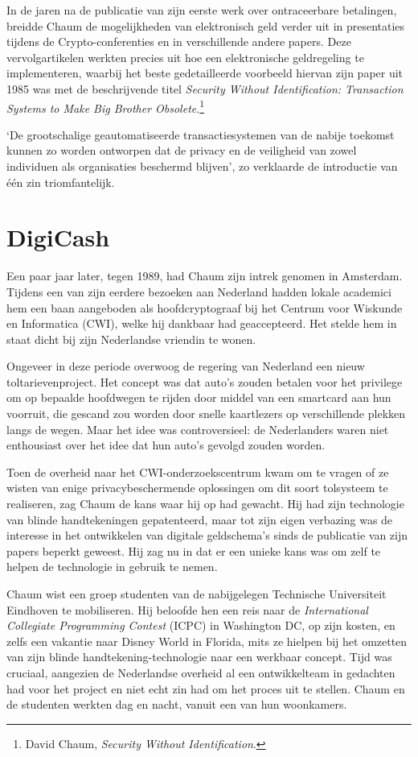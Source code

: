 \documentclass[
  a5paper,
  smalldemyvopaper,11pt,twoside,onecolumn,openright,extrafontsizes,
hidelinks]{memoir}
\begin{document}
In de jaren na de publicatie van zijn eerste werk over ontraceerbare
betalingen, breidde Chaum de mogelijkheden van elektronisch geld verder
uit in presentaties tijdens de Crypto-conferenties en in verschillende
andere papers. Deze vervolgartikelen werkten precies uit hoe een
elektronische geldregeling te implementeren, waarbij het beste
gedetailleerde voorbeeld hiervan zijn paper uit 1985 was met de
beschrijvende titel \emph{Security Without Identification: Transaction
Systems to Make Big Brother Obsolete}.\footnote{David Chaum,
  \emph{Security Without Identification}.}

`De grootschalige geautomatiseerde transactiesystemen van de nabije
toekomst kunnen zo worden ontworpen dat de privacy en de veiligheid van
zowel individuen als organisaties beschermd blijven', zo verklaarde de
introductie van één zin triomfantelijk.

\section{DigiCash}\label{digicash}

Een paar jaar later, tegen 1989, had Chaum zijn intrek genomen in
Amsterdam. Tijdens een van zijn eerdere bezoeken aan Nederland hadden
lokale academici hem een baan aangeboden als hoofdcryptograaf bij het
Centrum voor Wiskunde en Informatica (CWI), welke hij dankbaar had
geaccepteerd. Het stelde hem in staat dicht bij zijn Nederlandse
vriendin te wonen.

Ongeveer in deze periode overwoog de regering van Nederland een nieuw
toltarievenproject. Het concept was dat auto's zouden betalen voor het
privilege om op bepaalde hoofdwegen te rijden door middel van een
smartcard aan hun voorruit, die gescand zou worden door snelle
kaartlezers op verschillende plekken langs de wegen. Maar het idee was
controversieel: de Nederlanders waren niet enthousiast over het idee dat
hun auto's gevolgd zouden worden.

Toen de overheid naar het CWI-onderzoekscentrum kwam om te vragen of ze
wisten van enige privacybeschermende oplossingen om dit soort tolsysteem
te realiseren, zag Chaum de kans waar hij op had gewacht. Hij had zijn
technologie van blinde handtekeningen gepatenteerd, maar tot zijn eigen
verbazing was de interesse in het ontwikkelen van digitale geldschema's
sinds de publicatie van zijn papers beperkt geweest. Hij zag nu in dat
er een unieke kans was om zelf te helpen de technologie in gebruik te
nemen.

Chaum wist een groep studenten van de nabijgelegen Technische
Universiteit Eindhoven te mobiliseren. Hij beloofde hen een reis naar de
\emph{International Collegiate Programming Contest} (ICPC) in Washington
DC, op zijn kosten, en zelfs een vakantie naar Disney World in Florida,
mits ze hielpen bij het omzetten van zijn blinde
handtekening-technologie naar een werkbaar concept. Tijd was cruciaal,
aangezien de Nederlandse overheid al een ontwikkelteam in gedachten had
voor het project en niet echt zin had om het proces uit te stellen.
Chaum en de studenten werkten dag en nacht, vanuit een van hun
woonkamers.
\end{document}

